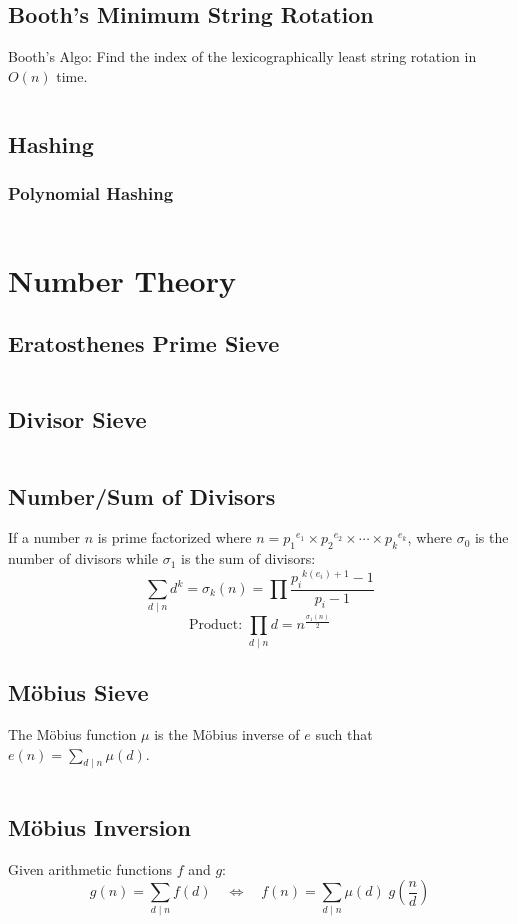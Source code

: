 \documentclass[8pt,a4paper,landscape,oneside]{amsart}
\newcommand{\code}[1]{\inputminted[fontsize=\normalsize,baselinestretch=1]{cpp}{_code/#1}}
\begin{document}
\begin{multicols*}{3}
  \subsection{Booth's Minimum String Rotation}
    Booth's Algo: Find the index of the lexicographically least string rotation in $O(n)$ time.
    \code{strings/booth.cpp}
	\subsection{Hashing}
    \subsubsection{Polynomial Hashing}
      \code{strings/polynomial_hashing.cpp}
\section{Number Theory}
	\subsection{Eratosthenes Prime Sieve}
    \code{numtheory/prime-sieve.cpp}
  \subsection{Divisor Sieve}
    \code{numtheory/divisor-sieve.cpp}
  \subsection{Number/Sum of Divisors}
    If a number $n$ is prime factorized where $n = {p_1}^{e_1} \times {p_2}^{e_2} \times \cdots \times {p_k}^{e_k}$, where $\sigma_0$ is the number of divisors while $\sigma_1$ is the sum of divisors:
    \[
    \sum_{d\mid n} d^k = \sigma_k (n) = \prod \frac{{p_i}^{k(e_i)+1}-1}{p_i -1}
    \]
    \[
    \text{Product: } \prod_{d\mid n} d = n^{\frac{\sigma_1 (n)}{2}}
    \]
  \subsection{M\"{o}bius Sieve}
    The M\"{o}bius function $\mu$ is the M\"{o}bius inverse of $e$ such that $e(n) = \sum_{d\mid n} \mu(d)$.
    \code{numtheory/moebius-sieve.cpp}
  \subsection{M\"{o}bius Inversion}
    Given arithmetic functions $f$ and $g$:
    \[
    g(n) = \sum_{d\mid n} f(d) \quad \Leftrightarrow \quad f(n) = \sum_{d\mid n} \mu(d)\; g\left(\frac{n}{d}\right)
    \]

\end{multicols*}
\end{document}
